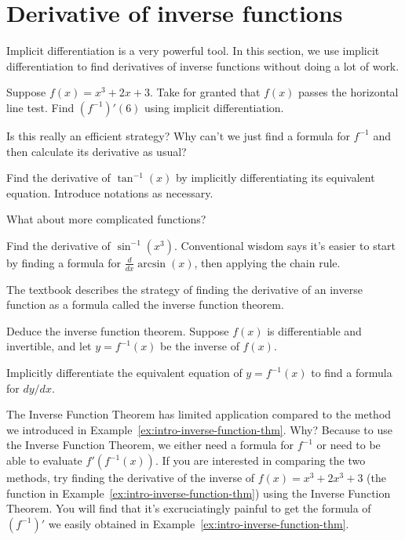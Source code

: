 \documentclass[../main.tex]{subfiles}
\begin{document}
 \section{Derivative of inverse functions}
Implicit differentiation is a very powerful tool. In this section, we use implicit differentiation to find derivatives of inverse functions without doing a lot of work.

\begin{example} \label{ex:intro-inverse-function-thm}
  Suppose \(f(x) = x^{3} + 2x + 3\). Take for granted that \(f(x)\) passes the horizontal line test. Find \((f^{-1})'(6)\) using implicit differentiation.

\end{example}
\faComment{} Is this really an efficient strategy? Why can't we just find a formula for \(f^{-1}\) and then calculate its derivative as usual?
\clearpage

\begin{example} \label{ex:derivative-of-arctan}
  Find the derivative of \(\tan^{-1}(x)\) by implicitly differentiating its equivalent equation.
  Introduce notations as necessary.

\end{example}

What about more complicated functions?
\begin{example} \label{ex:derivative-of-arcsin}
  Find the derivative of \(\sin^{-1}(x^{3})\).  Conventional wisdom says it's easier to start by finding a formula for \(\frac{d}{dx} \arcsin(x)\), then applying the chain rule.

\end{example}
\clearpage

The textbook describes the strategy of finding the derivative of an inverse function as a formula called the inverse function theorem.
\begin{example}
  Deduce the inverse function theorem.  Suppose \(f(x)\) is differentiable and invertible, and let \(y = f^{-1}(x)\) be the inverse of \(f(x)\).

  Implicitly differentiate the equivalent equation of \(y = f^{-1}(x)\) to find a formula for \(dy/dx\).

\end{example}

\faExclamationTriangle{} The Inverse Function Theorem has limited application compared to the method we introduced in Example~\ref{ex:intro-inverse-function-thm}. Why? Because to use the Inverse Function Theorem, we either need a formula for \(f^{-1}\) or need to be able to evaluate \(f'(f^{-1}(x))\). If you are interested in comparing the two methods, try finding the derivative of the inverse of \(f(x) = x^{3} + 2x^{3} + 3\) (the function in Example~\ref{ex:intro-inverse-function-thm}) using the Inverse Function Theorem. You will find that it's excruciatingly painful to get the formula of \((f^{-1})'\) we easily obtained in Example~\ref{ex:intro-inverse-function-thm}.
\end{document}
